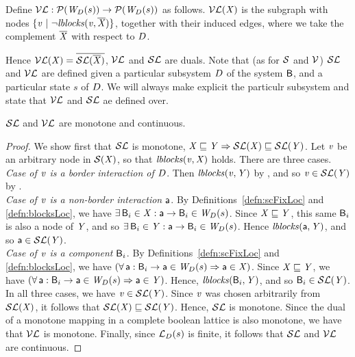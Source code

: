 \begin{definition}[$\lVFs$] \label{defn:violFixLoc}
Define $\lVFs: \lwfgS{B}{s}{\DS}  \to  \lwfgS{B}{s}{\DS}$ as follows.
$\lVF{\XS}$ is the subgraph with nodes $\set{\ndv \stt \neg \lblocks{\ndv}{\compl{\XS}} }$, together with their induced edges, 
where we take the complement $\compl{\XS}$ with respect to $\DS$.
\end{definition}

Hence $\lVF{\XS} = \overline{\lSF{\overline{\XS}}}$, \ie $\lVFs$ and $\lSFs$ are duals.
Note that (as for $\SFs$ and $\VFs$) $\lSFs$ and $\lVFs$ are defined given a particular
subsystem $\DS$ of the system 
$\B$, and a particular state $s$ of $\DS$. We will always make explicit the particulr
subsystem and state that $\lVFs$ and $\lSFs$ ae defined over.





\begin{proposition} \label{prop:monotoneLoc}
$\lSFs$ and $\lVFs$ are monotone and continuous.
\end{proposition}
%
\begin{proof}
We show first that $\lSFs$ is monotone, \ie $\XS \subg \YS \imp \lSF{\XS} \subg \lSF{\YS}$.
Let $\ndv$ be an arbitrary node in $\SF{\XS}$, so that $\lblocks{\ndv}{\XS}$ holds. There are three cases.\\

\emph{Case of $\ndv$ is a border interaction of $\DS$}. Then $\lblocks{\ndv}{\YS}$ by , and so $\ndv \in  \lSF{\YS}$ by
.\\

\emph{Case of $\ndv$ is a non-border interaction $\act$}. By Definitions~\ref{defn:scFixLoc} and \ref{defn:blocksLoc}, we have
$\ex \B_i \in \XS  : \act \ar \B_i \in \lwfg{B}{s}{\DS}$.
Since $\XS \subg \YS$, this same $\B_i$ is also a node of $\YS$, and so  $\ex \B_i \in \YS  : \act \ar \B_i \in \lwfg{B}{s}{\DS}$. 
Hence  $\lblocks{\act}{\YS}$, and so $\act \in \lSF{\YS}$. \\

\emph{Case of $\ndv$ is a component $\B_i$}. By Definitions~\ref{defn:scFixLoc} and \ref{defn:blocksLoc}, we have
$(\fa \act : \B_i \ar \act \in \lwfg{\B}{s}{\DS} \imp \act \in \XS)$.
Since $\XS \subg \YS$, we have  $(\fa \act : \B_i \ar \act \in \lwfg{B}{s}{\DS} \imp \act \in \YS)$. 
Hence, $\lblocks{\B_i}{\YS}$, and so $\B_i \in \lSF{\YS}$. \\

In all three cases, we have $\ndv \in \lSF{\YS}$. Since $\ndv$ was chosen arbitrarily from $\lSF{\XS} $, it follows that $\lSF{\XS} \subg \lSF{\YS}$. Hence, $\lSFs$ is monotone.
%
Since the dual of a monotone mapping in a complete boolean lattice is also monotone, we have that $\lVFs$ is monotone.
%
Finally, since $\llat{\B}{s}{\DS}$ is finite, it follows that $\lSFs$ and $\lVFs$ are continuous.
\end{proof}




